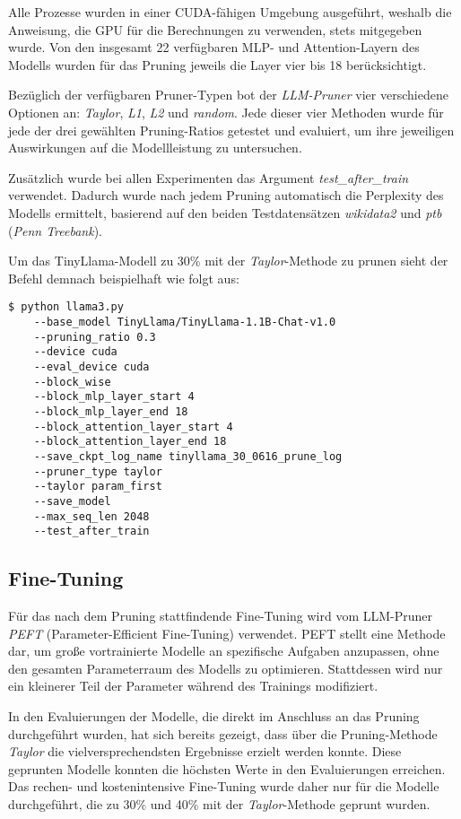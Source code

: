 Alle Prozesse wurden in einer CUDA-fähigen Umgebung ausgeführt, weshalb die
Anweisung, die GPU für die Berechnungen zu verwenden, stets mitgegeben wurde.
Von den insgesamt 22 verfügbaren MLP- und Attention-Layern des Modells wurden
für das Pruning jeweils die Layer vier bis 18 berücksichtigt.

Bezüglich der verfügbaren Pruner-Typen bot der \emph{LLM-Pruner} vier
verschiedene Optionen an: \emph{Taylor}, \emph{L1}, \emph{L2} und \emph{random}.
Jede dieser vier Methoden wurde für jede der drei gewählten Pruning-Ratios
getestet und evaluiert, um ihre jeweiligen Auswirkungen auf die Modellleistung
zu untersuchen.

Zusätzlich wurde bei allen Experimenten das Argument \emph{\-\-test\_after\_train}
verwendet. Dadurch wurde nach jedem Pruning automatisch die Perplexity des
Modells ermittelt, basierend auf den beiden Testdatensätzen \emph{wikidata2} und
\emph{ptb} (\emph{Penn Treebank}).

Um das TinyLlama-Modell zu 30\% mit der \emph{Taylor}-Methode zu prunen sieht
der Befehl demnach beispielhaft wie folgt aus:

\vspace{1em}
\begin{lstlisting}
$ python llama3.py 
    --base_model TinyLlama/TinyLlama-1.1B-Chat-v1.0
    --pruning_ratio 0.3
    --device cuda
    --eval_device cuda
    --block_wise
    --block_mlp_layer_start 4
    --block_mlp_layer_end 18
    --block_attention_layer_start 4
    --block_attention_layer_end 18
    --save_ckpt_log_name tinyllama_30_0616_prune_log
    --pruner_type taylor
    --taylor param_first
    --save_model
    --max_seq_len 2048
    --test_after_train
\end{lstlisting}

\subsection{Fine-Tuning}

Für das nach dem Pruning stattfindende Fine-Tuning wird vom LLM-Pruner
\emph{PEFT} (Parameter-Efficient Fine-Tuning) verwendet. PEFT stellt eine
Methode dar, um große vortrainierte Modelle an spezifische Aufgaben anzupassen,
ohne den gesamten Parameterraum des Modells zu optimieren. Stattdessen wird nur
ein kleinerer Teil der Parameter während des Trainings modifiziert.

In den Evaluierungen der Modelle, die direkt im Anschluss an das Pruning
durchgeführt wurden, hat sich bereits gezeigt, dass über die Pruning-Methode
\emph{Taylor} die vielversprechendsten Ergebnisse erzielt werden konnte. Diese
geprunten Modelle konnten die höchsten Werte in den Evaluierungen erreichen. Das
rechen- und kostenintensive Fine-Tuning wurde daher nur für die Modelle
durchgeführt, die zu 30\% und 40\% mit der \emph{Taylor}-Methode geprunt wurden.

